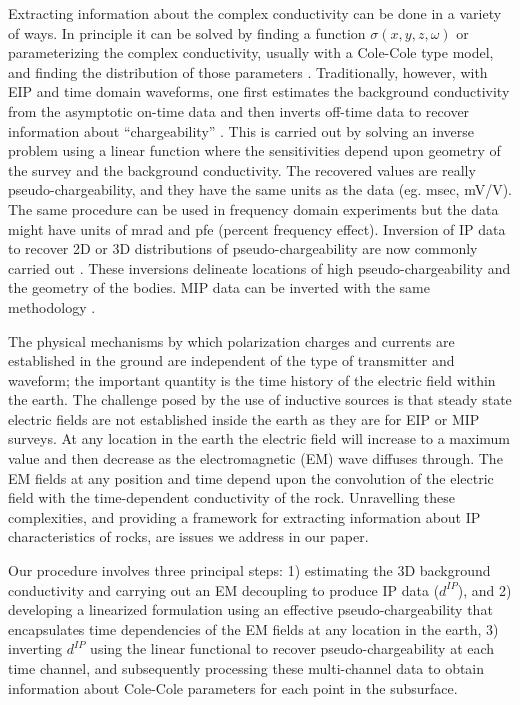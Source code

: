 \documentclass[letterpaper,11pt]{article}
\newcommand{\dip}{d^{IP}}
\begin{document}
Extracting information about the complex conductivity can be done in a variety of ways. In principle it can be solved by finding a function $\sigma(x,y,z,\omega)$ or parameterizing the complex conductivity, usually with a Cole-Cole type model, and finding the distribution of those parameters \cite[]{Fiandaca2012, Marchant2013,Xu2013}. Traditionally, however, with EIP and time domain waveforms, one first estimates the background conductivity from the asymptotic on-time data and then inverts off-time data to recover information about ``chargeability'' \cite[]{doug1994}. This is carried out by solving an inverse problem using a linear function where the sensitivities depend upon geometry of the survey and the background conductivity. The recovered values are really pseudo-chargeability, and they have the same units as the data (eg. msec, mV/V). The same procedure can be used in frequency domain experiments but the data might have units of mrad and pfe (percent frequency effect). Inversion of IP data to recover 2D or 3D distributions of pseudo-chargeability are now commonly carried out \cite[]{Kemna2012}. These inversions delineate locations of high pseudo-chargeability and the geometry of the bodies. MIP data can be inverted with the same methodology \cite[]{Chen2003}. 

The physical mechanisms by which polarization charges and currents are established in the ground are independent of the type of transmitter and waveform; the important quantity is the time history of the electric field within the earth. The challenge posed by the use of  inductive sources is that steady state electric fields are not established inside the earth as they are for EIP or MIP surveys. At any location in the earth the electric field will increase to a maximum value and then decrease as the electromagnetic (EM) wave diffuses through. The EM fields at any position and time depend upon the convolution of the electric field with the time-dependent conductivity of the rock. Unravelling these complexities, and providing a framework for extracting information about IP characteristics of rocks, are issues we address in our paper. 

Our procedure involves three principal steps: 1) estimating the 3D background conductivity and carrying out an EM decoupling to produce IP data ($\dip$), and 2) developing a linearized formulation using an effective pseudo-chargeability that encapsulates time dependencies of the EM fields at any location in the earth, 3) inverting $\dip$ using the linear functional to recover pseudo-chargeability at each time channel, and subsequently processing these multi-channel data to obtain information about Cole-Cole parameters for each point in the subsurface. 
\end{document}

